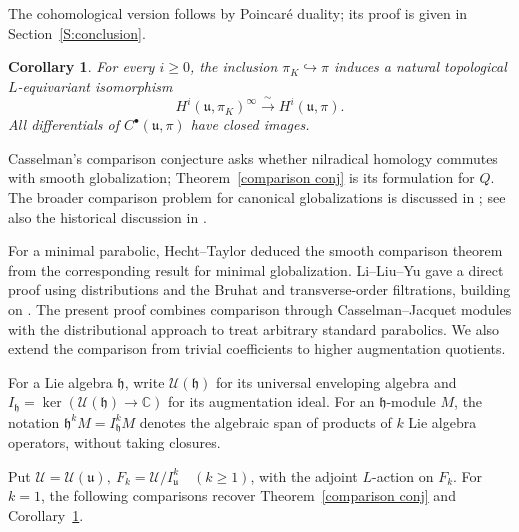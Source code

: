 \documentclass[a4paper,12pt]{amsart}
\numberwithin{equation}{section}
\theoremstyle{plain}
\newtheorem{corollary}[theorem]{Corollary}
\theoremstyle{definition}
\theoremstyle{remark}
\begin{document}
The cohomological version follows by Poincar\'e duality; its proof is given in Section~\ref{S:conclusion}.
\begin{corollary}\label{C:cohomological-comparison}
For every $i\geq0$, the inclusion $\pi_K\hookrightarrow\pi$ induces a natural topological $L$-equivariant isomorphism
\[
 H^i(\mathfrak u,\pi_K)^\infty\xrightarrow{\ \sim\ }
 H^i(\mathfrak u,\pi).
\]
All differentials of $C^\bullet(\mathfrak u,\pi)$ have closed images.
\end{corollary}

Casselman's comparison conjecture asks whether nilradical homology commutes with smooth globalization; Theorem~\ref{comparison conj} is its formulation for $Q$.
The broader comparison problem for canonical globalizations is discussed in \cite[Conjecture~10.3]{Vogan08}; see also the historical discussion in \cite[Introduction]{LLY}.

For a minimal parabolic, Hecht--Taylor \cite{Hecht-Taylor3} deduced the smooth comparison theorem from the corresponding result for minimal globalization.
Li--Liu--Yu \cite{LLY} gave a direct proof using distributions and the Bruhat and transverse-order filtrations, building on \cite{Casselman-Hecht-Milicic}.
The present proof combines comparison through Casselman--Jacquet modules with the distributional approach to treat arbitrary standard parabolics.
We also extend the comparison from trivial coefficients to higher augmentation quotients.

For a Lie algebra $\mathfrak h$, write $\mathcal U(\mathfrak h)$ for its universal enveloping algebra and $I_{\mathfrak h}=\ker(\mathcal U(\mathfrak h)\to\mathbb C)$ for its augmentation ideal.
For an $\mathfrak h$-module $M$, the notation $\mathfrak h^kM=I_{\mathfrak h}^kM$ denotes the algebraic span of products of $k$ Lie algebra operators, without taking closures.

Put $\mathscr U=\mathcal U(\mathfrak u),\
 F_k=\mathscr U/I_{\mathfrak u}^k\quad(k\geq1)$,
with the adjoint $L$-action on $F_k$.
For $k=1$, the following comparisons recover Theorem~\ref{comparison conj} and Corollary~\ref{C:cohomological-comparison}.
\end{document}
